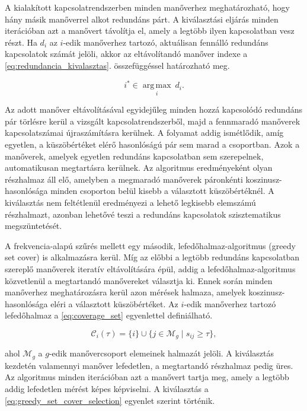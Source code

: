 \documentclass[12pt,a4paper,onehalfspacing, oneside]{book} %
\begin{document}
A kialakított kapcsolatrendszerben minden manőverhez meghatározható, hogy hány másik manőverrel alkot redundáns párt. A kiválasztási eljárás minden iterációban azt a manővert távolítja el, amely a legtöbb ilyen kapcsolatban vesz részt. Ha $d_i$ az $i$-edik manőverhez tartozó, aktuálisan fennálló redundáns kapcsolatok számát jelöli, akkor az eltávolítandó manőver indexe a \ref{eq:redundancia_kivalasztas}. összefüggéssel határozható meg.

\begin{equation}
i^* \in \underset{i}{\operatorname{arg\,max}}\ d_i.
\label{eq:redundancia_kivalasztas}
\end{equation}

Az adott manőver eltávolításával egyidejűleg minden hozzá kapcsolódó redundáns pár törlésre kerül a vizsgált kapcsolatrendszerből, majd a fennmaradó manőverek kapcsolatszámai újraszámításra kerülnek. A folyamat addig ismétlődik, amíg egyetlen, a küszöbértéket elérő hasonlóságú pár sem marad a csoportban. Azok a manőverek, amelyek egyetlen redundáns kapcsolatban sem szerepelnek, automatikusan megtartásra kerülnek. Az algoritmus eredményeként olyan részhalmaz áll elő, amelyben a megmaradó manőverek páronkénti koszinusz-hasonlósága minden csoporton belül kisebb a választott küszöbértéknél. A kiválasztás nem feltétlenül eredményezi a lehető legkisebb elemszámú részhalmazt, azonban lehetővé teszi a redundáns kapcsolatok szisztematikus megszüntetését.

A frekvencia-alapú szűrés mellett egy második, lefedőhalmaz-algoritmus (greedy set cover) is alkalmazásra kerül. Míg az előbbi a legtöbb redundáns kapcsolatban szereplő manőverek iteratív eltávolítására épül, addig a lefedőhalmaz-algoritmus közvetlenül a megtartandó manővereket választja ki. Ennek során minden manőverhez meghatározásra kerül azon mérések halmaza, amelyek koszinusz-hasonlósága eléri a választott küszöbértéket. Az $i$-edik manőverhez tartozó lefedőhalmaz a \ref{eq:coverage_set} egyenlettel definiálható.

\begin{equation}
    \mathcal{C}_i(\tau)=\{i\}\cup\{j\in\mathcal{M}_g\mid s_{ij}\geq\tau\},
    \label{eq:coverage_set}
\end{equation}

ahol $\mathcal{M}_g$ a $g$-edik manővercsoport elemeinek halmazát jelöli. A kiválasztás kezdetén valamennyi manőver lefedetlen, a megtartandó részhalmaz pedig üres. Az algoritmus minden iterációban azt a manővert tartja meg, amely a legtöbb addig lefedetlen mérést képes képviselni. A kiválasztás a \ref{eq:greedy_set_cover_selection} egyenlet szerint történik.
\end{document}
